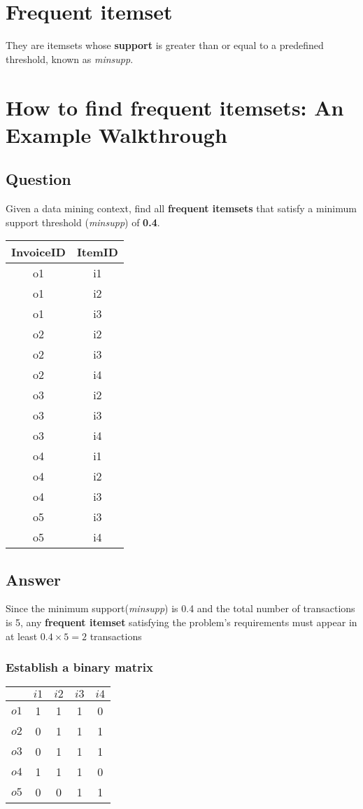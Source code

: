\section{Frequent itemset}
They are itemsets whose \textbf{support} is greater than or equal to a predefined threshold, known as \textit{minsupp}.
\section{How to find frequent itemsets: An Example Walkthrough}
\subsection{Question}
Given a data mining context, find all \textbf{frequent itemsets} that satisfy a minimum support threshold (\textit{minsupp}) of \textbf{0.4}.
\begin{center}
\begin{tabular}{|c|c|}
\hline InvoiceID & ItemID \\
\hline o1 & i1 \\
\hline o1 & i2 \\
\hline o1 & i3 \\
\hline o2 & i2 \\
\hline o2 & i3 \\
\hline o2 & i4 \\
\hline o3 & i2 \\
\hline o3 & i3 \\
\hline o3 & i4 \\
\hline o4 & i1 \\
\hline o4 & i2 \\
\hline o4 & i3 \\
\hline o5 & i3 \\
\hline o5 & i4 \\
\hline
\end{tabular}
\end{center}
\subsection{Answer}
Since the minimum support(\textit{minsupp}) is 0.4 and the total number of transactions is 5, any \textbf{frequent itemset} satisfying the problem's requirements must appear in at least \(0.4 \times 5 = 2\) transactions
\subsubsection{Establish a binary matrix}
\begin{center}
\begin{tabular}{|*{5}{c|}}
\hline & \(i1\) & \(i2\) & \(i3\) & \(i4\) \\
\hline \(o1\) & 1 & 1 & 1 & 0 \\
\hline \(o2\) & 0 & 1 & 1 & 1 \\
\hline \(o3\) & 0 & 1 & 1 & 1 \\
\hline \(o4\) & 1 & 1 & 1 & 0 \\
\hline \(o5\) & 0 & 0 & 1 & 1 \\
\hline
\end{tabular}
\end{center}

